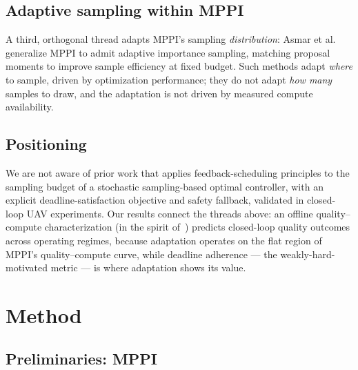 \documentclass[conference]{IEEEtran}
\begin{document}
\subsection{Adaptive sampling within MPPI}

A third, orthogonal thread adapts MPPI's sampling \emph{distribution}:
Asmar et al.~\cite{asmar2023mpopis} generalize MPPI to admit adaptive
importance sampling, matching proposal moments to improve sample
efficiency at fixed budget. Such methods adapt \emph{where} to sample,
driven by optimization performance; they do not adapt \emph{how many}
samples to draw, and the adaptation is not driven by measured compute
availability.

\subsection{Positioning}

We are not aware of prior work that applies feedback-scheduling
principles to the sampling budget of a stochastic sampling-based optimal
controller, with an explicit deadline-satisfaction objective and safety
fallback, validated in closed-loop UAV experiments. Our results connect
the threads above: an
offline quality--compute characterization (in the spirit
of~\cite{pant2021anytime}) predicts closed-loop quality outcomes across
operating regimes, because adaptation operates on the flat region of
MPPI's quality--compute curve, while deadline adherence --- the
weakly-hard-motivated metric --- is where adaptation shows its value.

\section{Method}
\label{sec:method}

\subsection{Preliminaries: MPPI}
\end{document}

